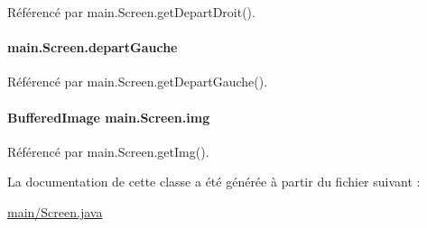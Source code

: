 Référencé par main.\+Screen.\+get\+Depart\+Droit().

\hypertarget{classmain_1_1Screen_aa0efb77861026c69cdb5675e2734fdf7}{}
\paragraph[{depart\+Gauche}]{ main.\+Screen.\+depart\+Gauche\hspace{0.3cm}{\ttfamily [private]}}\label{classmain_1_1Screen_aa0efb77861026c69cdb5675e2734fdf7}


Référencé par main.\+Screen.\+get\+Depart\+Gauche().

\hypertarget{classmain_1_1Screen_aa7f8e8fdd911afa3e27ebd437fe7d8e4}{}
\paragraph[{img}]{\setlength{\rightskip}{0pt plus 5cm}Buffered\+Image main.\+Screen.\+img\hspace{0.3cm}{\ttfamily [private]}}\label{classmain_1_1Screen_aa7f8e8fdd911afa3e27ebd437fe7d8e4}


Référencé par main.\+Screen.\+get\+Img().



La documentation de cette classe a été générée à partir du fichier suivant \+:\begin{DoxyCompactItemize}
\item 
\hyperlink{main_2Screen_8java}{main/\+Screen.\+java}\end{DoxyCompactItemize}
